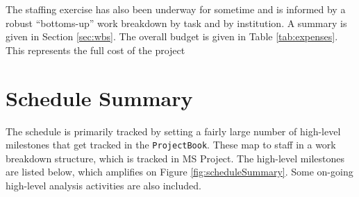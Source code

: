 \documentclass[preprint]{aastex}
\begin{document}
The staffing exercise has also been underway for sometime and is informed by a robust
``bottoms-up'' work breakdown by task and by institution. A summary is given in Section \ref{sec:wbs}.
The overall budget is given in Table \ref{tab:expenses}.  This represents the full cost of the project


\section{Schedule Summary}
\label{sec:schedule}
The schedule is primarily tracked by setting a fairly large number of high-level
milestones that get tracked in the {\tt ProjectBook}. These map to staff in a work
breakdown structure, which is tracked in MS Project. The high-level milestones are
listed below, which amplifies on Figure \ref{fig:scheduleSummary}.  Some on-going
high-level analysis activities are also included.
\end{document}
